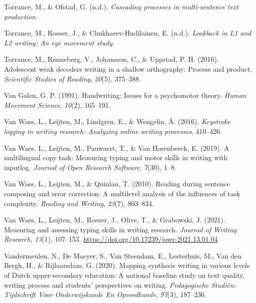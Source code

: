 \documentclass[
  man,floatsintext]{apa7}
\newlength{\cslhangindent}
\newlength{\cslentryspacingunit} %
\newenvironment{CSLReferences}[2] %
 {%
  \setlength{\parindent}{0pt}
  \ifodd #1
  \let\oldpar\par
  \def\par{\hangindent=\cslhangindent\oldpar}
  \fi
  \setlength{\parskip}{#2\cslentryspacingunit}
 }%
 {}
\begin{document}
\begin{CSLReferences}{1}{0}
\leavevmode{}%
Torrance, M., \& Ofstad, G. (n.d.). \emph{Cascading processes in multi-sentence text production}.

\leavevmode{}%
Torrance, M., Roeser, J., \& Chukharev-Hudilainen, E. (n.d.). \emph{Lookback in {L1 and L2} writing: An eye movement study}.

\leavevmode{}%
Torrance, M., Rønneberg, V., Johansson, C., \& Uppstad, P. H. (2016). Adolescent weak decoders writing in a shallow orthography: Process and product. \emph{Scientific Studies of Reading}, \emph{20}(5), 375--388.

\leavevmode{}%
Van Galen, G. P. (1991). Handwriting: Issues for a psychomotor theory. \emph{Human Movement Science}, \emph{10}(2), 165--191.

\leavevmode{}%
Van Waes, L., Leijten, M., Lindgren, E., \& Wengelin, Å. (2016). \emph{Keystroke logging in writing research: Analyzing online writing processes}. 410--426.

\leavevmode{}%
Van Waes, L., Leijten, M., Pauwaert, T., \& Van Horenbeeck, E. (2019). A multilingual copy task: Measuring typing and motor skills in writing with inputlog. \emph{Journal of Open Research Software}, \emph{7}(30), 1--8.

\leavevmode{}%
Van Waes, L., Leijten, M., \& Quinlan, T. (2010). Reading during sentence composing and error correction: A multilevel analysis of the influences of task complexity. \emph{Reading and Writing}, \emph{23}(7), 803--834.

\leavevmode{}%
Van Waes, L., Leijten, M., Roeser, J., Olive, T., \& Grabowski, J. (2021). Measuring and assessing typing skills in writing research. \emph{Journal of Writing Research}, \emph{13}(1), 107--153. \url{https://doi.org/10.17239/jowr-2021.13.01.04}

\leavevmode{}%
Vandermeulen, N., De Maeyer, S., Van Steendam, E., Lesterhuis, M., Van den Bergh, H., \& Rijlaarsdam, G. (2020). Mapping synthesis writing in various levels of {Dutch} upper-secondary education: A national baseline study on text quality, writing process and students' perspectives on writing. \emph{Pedagogische Studiën: Tijdschrift Voor Onderwijskunde En Opvoedkunde}, \emph{97}(3), 187--236.


\end{CSLReferences}
\end{document}
